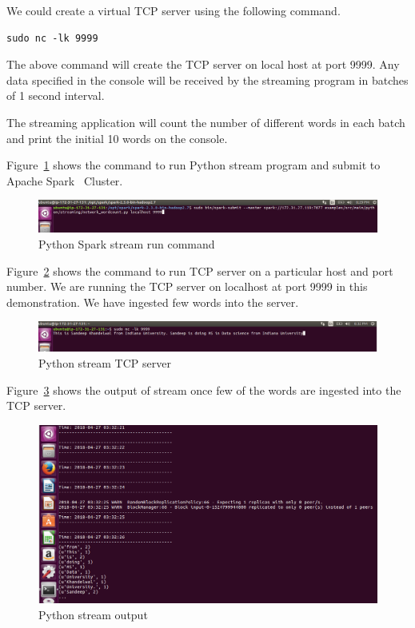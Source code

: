 We could create a virtual TCP server using the following command.

\begin{verbatim}
sudo nc -lk 9999
\end{verbatim}

The above command will create the TCP server on local host at port
9999. Any data specified in the console will be received by the
streaming program in batches of 1 second interval.

The streaming application will count the number of different words in
each batch and print the initial 10 words on the console.

Figure~\ref{f:python-spark-stream-run-command} shows the command to
run Python stream program and submit to Apache
Spark~\cite{hid-sp18-511-www-spark} Cluster.

\begin{figure}[!ht]
	\centering\includegraphics[width=\columnwidth]
        {images/pythonstreamprogruncoammand.png} \caption{Python
	Spark stream run
	command}\label{f:python-spark-stream-run-command}
\end{figure}

Figure~\ref{f:python-stream-tcp-server.png} shows the command to run
TCP server on a particular host and port number. We are running the
TCP server on localhost at port 9999 in this demonstration. We have
ingested few words into the server.

\begin{figure}[!ht]
	\centering\includegraphics[width=\columnwidth]
        {images/pythonstreamtcpserver.png} \caption{Python
	stream TCP server}\label{f:python-stream-tcp-server.png}
\end{figure}

Figure~\ref{f:python_stream_prog_run_output.png} shows the output of
stream once few of the words are ingested into the TCP server.

\begin{figure}[!ht]
	\centering\includegraphics[width=\columnwidth]
        {images/pythonstreamprogrunoutput.png} \caption{Python
	stream output}\label{f:python_stream_prog_run_output.png}
\end{figure}

